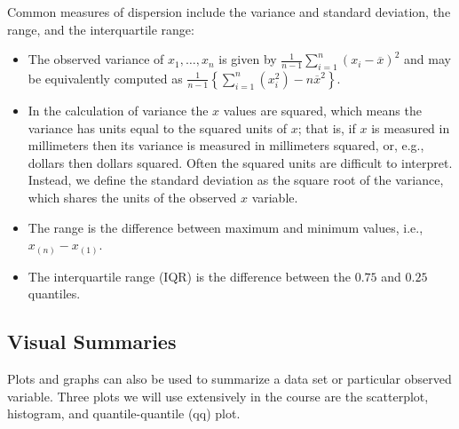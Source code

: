 \documentclass[
]{book}
\providecommand{\tightlist}{%
  \setlength{\itemsep}{0pt}\setlength{\parskip}{0pt}}
\begin{document}
Common measures of dispersion include the variance and standard deviation, the range, and the interquartile range:

\begin{itemize}
\tightlist
\item
  The observed variance of \(x_1, \ldots, x_n\) is given by \(\tfrac{1}{n-1}\sum_{i=1}^n(x_i - \overline x)^2\) and may be equivalently computed as \(\tfrac{1}{n-1}\left\{\sum_{i=1}^n (x_i^2) - n\overline x^2\right\}\).\\
\item
  In the calculation of variance the \(x\) values are squared, which means the variance has units equal to the squared units of \(x\); that is, if \(x\) is measured in millimeters then its variance is measured in millimeters squared, or, e.g., dollars then dollars squared. Often the squared units are difficult to interpret. Instead, we define the standard deviation as the square root of the variance, which shares the units of the observed \(x\) variable.\\
\item
  The range is the difference between maximum and minimum values, i.e., \(x_{(n)} - x_{(1)}\).
\item
  The interquartile range (IQR) is the difference between the \(0.75\) and \(0.25\) quantiles.
\end{itemize}

\hypertarget{visual-summaries}{%
\subsection{Visual Summaries}\label{visual-summaries}}

Plots and graphs can also be used to summarize a data set or particular observed variable. Three plots we will use extensively in the course are the scatterplot, histogram, and quantile-quantile (qq) plot.
\end{document}
